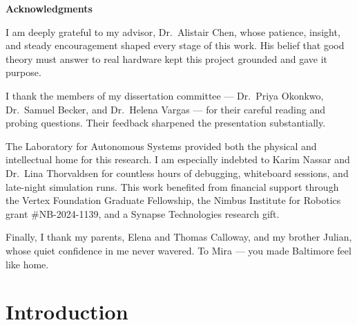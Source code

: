 \documentclass[12pt,oneside]{report}
\theoremstyle{definition}
\theoremstyle{remark}
\begin{document}
\clearpage

\thispagestyle{empty}
{}
\begin{center}
  {\LARGE\bfseries\color{jhublue} Acknowledgments}
\end{center}
\vspace{16pt}

I am deeply grateful to my advisor, Dr.\ Alistair Chen, whose patience, insight,
and steady encouragement shaped every stage of this work. His belief that good theory
must answer to real hardware kept this project grounded and gave it purpose.

I thank the members of my dissertation committee --- Dr.\ Priya Okonkwo, Dr.\ Samuel
Becker, and Dr.\ Helena Vargas --- for their careful reading and probing questions.
Their feedback sharpened the presentation substantially.

The Laboratory for Autonomous Systems provided both the physical and intellectual
home for this research. I am especially indebted to Karim Nassar and Dr.\ Lina
Thorvaldsen for countless hours of debugging, whiteboard sessions, and late-night
simulation runs. This work benefited from financial support through the Vertex
Foundation Graduate Fellowship, the Nimbus Institute for Robotics grant \#NB-2024-1139,
and a Synapse Technologies research gift.

Finally, I thank my parents, Elena and Thomas Calloway, and my brother Julian,
whose quiet confidence in me never wavered. To Mira --- you made Baltimore feel
like home.

\clearpage

{}
\renewcommand{\contentsname}{\centering\LARGE\bfseries\color{jhublue} Table of Contents}
\tableofcontents
\cleardoublepage

{}
\renewcommand{\listfigurename}{\centering\LARGE\bfseries\color{jhublue} List of Figures}
\listoffigures
{}
\renewcommand{\listtablename}{\centering\LARGE\bfseries\color{jhublue} List of Tables}
\listoftables
\cleardoublepage

\chapter{Introduction}
\setcounter{page}{1}
\end{document}

